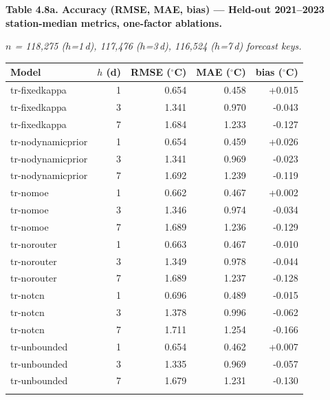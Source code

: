 \begin{table}[htbp]
\centering
\footnotesize
\setlength{\tabcolsep}{4pt}
\renewcommand{\arraystretch}{1.1}
\textbf{Table 4.8a. Accuracy (RMSE, MAE, bias) --- Held-out 2021--2023 station-median metrics, one-factor ablations.}
\par\smallskip
\textit{$n$ = 118,275 ($h$=1\,d), 117,476 ($h$=3\,d), 116,524 ($h$=7\,d) forecast keys.}
\par\medskip
\begin{tabular}{@{}lrrrr@{}}
\toprule\noalign{}
Model & $h$ (d) & RMSE ($^\circ$C) & MAE ($^\circ$C) & bias ($^\circ$C) \\
\midrule\noalign{}
tr-fixedkappa & 1 & 0.654 & 0.458 & +0.015 \\
tr-fixedkappa & 3 & 1.341 & 0.970 & -0.043 \\
tr-fixedkappa & 7 & 1.684 & 1.233 & -0.127 \\
tr-nodynamicprior & 1 & 0.654 & 0.459 & +0.026 \\
tr-nodynamicprior & 3 & 1.341 & 0.969 & -0.023 \\
tr-nodynamicprior & 7 & 1.692 & 1.239 & -0.119 \\
tr-nomoe & 1 & 0.662 & 0.467 & +0.002 \\
tr-nomoe & 3 & 1.346 & 0.974 & -0.034 \\
tr-nomoe & 7 & 1.689 & 1.236 & -0.129 \\
tr-norouter & 1 & 0.663 & 0.467 & -0.010 \\
tr-norouter & 3 & 1.349 & 0.978 & -0.044 \\
tr-norouter & 7 & 1.689 & 1.237 & -0.128 \\
tr-notcn & 1 & 0.696 & 0.489 & -0.015 \\
tr-notcn & 3 & 1.378 & 0.996 & -0.062 \\
tr-notcn & 7 & 1.711 & 1.254 & -0.166 \\
tr-unbounded & 1 & 0.654 & 0.462 & +0.007 \\
tr-unbounded & 3 & 1.335 & 0.969 & -0.057 \\
tr-unbounded & 7 & 1.679 & 1.231 & -0.130 \\
\bottomrule\noalign{}
\end{tabular}
\end{table}

